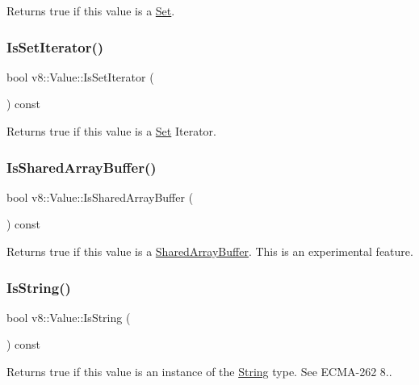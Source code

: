 Returns true if this value is a \mbox{\hyperlink{classv8_1_1Set}{Set}}. \mbox{\label{classv8_1_1Value_a908403b5e09eb5dc0087b562b01618a4}} 
\subsubsection{\texorpdfstring{Is\+Set\+Iterator()}{IsSetIterator()}}
{\footnotesize\ttfamily bool v8\+::\+Value\+::\+Is\+Set\+Iterator (\begin{DoxyParamCaption}{ }\end{DoxyParamCaption}) const}

Returns true if this value is a \mbox{\hyperlink{classv8_1_1Set}{Set}} Iterator. \mbox{\label{classv8_1_1Value_a1d7d90fe704feab89dcbdc383ab298b2}} 
\subsubsection{\texorpdfstring{Is\+Shared\+Array\+Buffer()}{IsSharedArrayBuffer()}}
{\footnotesize\ttfamily bool v8\+::\+Value\+::\+Is\+Shared\+Array\+Buffer (\begin{DoxyParamCaption}{ }\end{DoxyParamCaption}) const}

Returns true if this value is a \mbox{\hyperlink{classv8_1_1SharedArrayBuffer}{Shared\+Array\+Buffer}}. This is an experimental feature. \mbox{\label{classv8_1_1Value_a6c7582919eec6f30e865b3300eff9a8e}} 
\subsubsection{\texorpdfstring{Is\+String()}{IsString()}}
{\footnotesize\ttfamily bool v8\+::\+Value\+::\+Is\+String (\begin{DoxyParamCaption}{ }\end{DoxyParamCaption}) const}

Returns true if this value is an instance of the \mbox{\hyperlink{classv8_1_1String}{String}} type. See E\+C\+M\+A-\/262 8.. \mbox{\label{classv8_1_1Value_a32054145eadf3b1a3f900dcd52110e2b}} 
